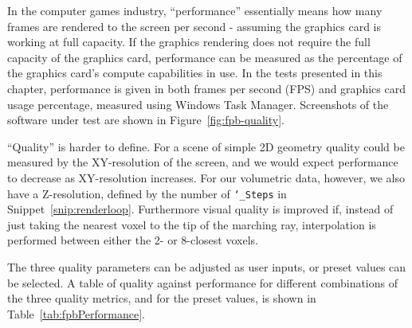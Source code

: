 In the computer games industry, ``performance'' essentially means how many frames are rendered to the screen per second - assuming the graphics card is working at full capacity.
If the graphics rendering does not require the full capacity of the graphics card, performance can be measured as the percentage of the graphics card's compute capabilities in use.
In the tests presented in this chapter, performance is given in both frames per second (FPS) and graphics card usage percentage, measured using Windows Task Manager.
Screenshots of the software under test are shown in Figure~\ref{fig:fpb-quality}.

``Quality'' is harder to define.
For a scene of simple 2D geometry quality could be measured by the XY-resolution of the screen, and we would expect performance to decrease as XY-resolution increases.
For our volumetric data, however, we also have a Z-resolution, defined by the number of \texttt{\char`_Steps} in Snippet~\ref{snip:renderloop}.
Furthermore visual quality is improved if, instead of just taking the nearest voxel to the tip of the marching ray, interpolation is performed between either the 2- or 8-closest voxels.

The three quality parameters can be adjusted as user inputs, or preset values can be selected.
A table of quality against performance for different combinations of the three quality metrics, and for the preset values, is shown in Table~\ref{tab:fpbPerformance}. 

